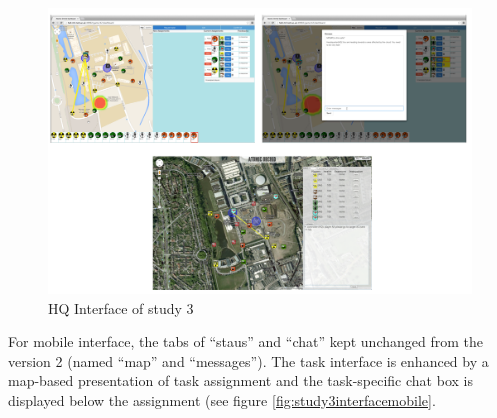 \begin{figure}[H]
  \centering
  \includegraphics[width=1\textwidth]{img/conclusion/study3interfaceHQ}
  \caption{HQ Interface of study 3}
  \label{fig:study3interfacehq}
\end{figure}

For mobile interface, the tabs of ``staus'' and ``chat'' kept unchanged from the version 2 (named ``map'' and ``messages''). The task interface is enhanced by a map-based presentation of task assignment and the task-specific chat box is displayed below the assignment (see figure \ref{fig:study3interfacemobile}.

